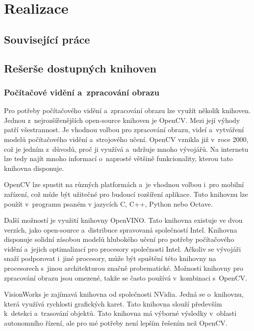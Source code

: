 \chapter{Realizace}

\section{Související práce}

\section{Rešerše dostupných knihoven}

\subsection{Počítačové vidění a~zpracování obrazu}

Pro potřeby počítačového vidění a~zpracování obrazu lze využít několik knihoven. Jednou z~nejrozšířenějších open-source knihoven je OpenCV. Mezi její výhody patří všestrannost. Je vhodnou volbou pro zpracování obrazu, videí a~vytváření modelů počítačového vidění a~strojového učení. OpenCV vznikla již v~roce 2000, což je jedním z~důvodů, proč ji využívá a~udržuje mnoho vývojářů. Na internetu lze tedy najít mnoho informací o~naprosté většině funkcionality, kterou tato knihovna disponuje.

OpenCV lze spustit na různých platformách a~je vhodnou volbou i~pro mobilní zařízení, což může být užitečné pro budoucí rozšíření aplikace. Tuto knihovnu lze použít v~programu psaném v jazycích C, C++, Python nebo Octave.

Další možností je využití knihovny OpenVINO. Tato knihovna existuje ve dvou verzích, jako open-source a~distribuce spravovaná společností Intel. Knihovna disponuje solidní zásobou modelů hlubokého učení pro potřeby počítačového vidění a~jejich optimalizací pro procesory společnosti Intel. Ačkoliv se vývojáři snaží podporovat i~jiné procesory, může být spuštění této knihovny na procesorech s~jinou architekturou značně probematické. Možnosti knihovny pro zpracování obrazu jsou omezené, takže se často používá v~kombinaci s~OpenCV.

VisionWorks je zajímavá knihovna od společnosti NVidia. Jedná se o~knihovnu, která využívá rychlosti grafických karet. Tato knihovna slouží především k~detekci a~trasování objektů. Tato knihovna má výborné výsledky v~oblasti autonomního řízení, ale pro mé potřeby není lepším řešením než OpenCV.

